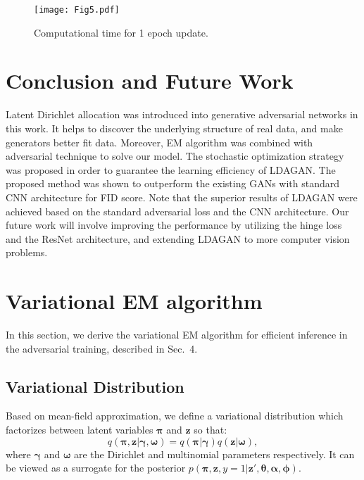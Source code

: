 \documentclass{article}
\begin{document}
\begin{figure}[h]
  \centering
    \texttt{[image: Fig5.pdf]}
     \caption{Computational time for 1 epoch update.}
     \label{fig:Time}
\end{figure}




\section{Conclusion and Future Work}
\label{sec:Conclusion}
Latent Dirichlet allocation was introduced into generative adversarial networks in this work.
It helps to discover the underlying structure of real data, and make generators better fit data.
Moreover, EM algorithm was combined with adversarial technique to solve our model.
The stochastic optimization strategy was proposed in order to guarantee the learning efficiency of LDAGAN.
The proposed method was shown to outperform the existing GANs with standard CNN architecture for FID score.
Note that the superior results of LDAGAN were achieved based on the standard adversarial loss and the CNN architecture.
Our future work will involve improving the performance by utilizing the hinge loss and the ResNet architecture, and extending LDAGAN to more computer vision problems.






\onecolumn
\appendix
\section{Variational EM algorithm}
\label{Appendix}

In this section, we derive the variational EM algorithm for efficient inference in the adversarial training,  described in Sec.~4.

\subsection{Variational Distribution}
\label{App:VaDistribution}

Based on mean-field approximation, we define a variational distribution which factorizes between latent variables $\bm{\pi}$ and $\bm{z}$ so that:
\begin{equation}
\label{eq:AVarDis1}
q\left( \bm{\pi}, \mathbf{z}|\bm{\gamma},\bm{\omega} \right)
=
q\left( \bm{\pi} | \bm{\gamma} \right)
q\left( \mathbf{z} | \bm{\omega} \right),
\end{equation}
where $\bm{\gamma}$ and $\bm{\omega}$ are the Dirichlet and multinomial parameters respectively.
It can be viewed as a surrogate for the posterior $p\left(\bm{\pi}, \mathbf{z}, y=1|\mathbf{z}',\bm{\theta}, \bm{\alpha},\bm{\phi}\right)$.
\end{document}
